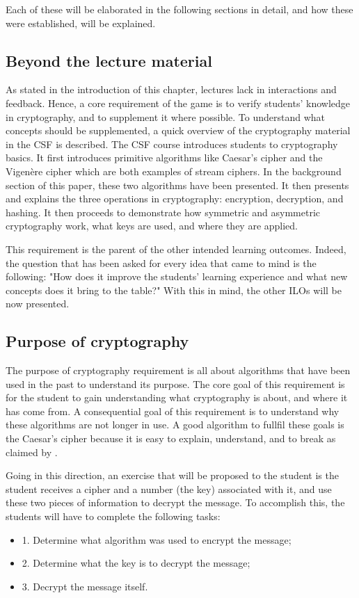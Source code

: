 \documentclass{l4proj}
\begin{document}
Each of these will be elaborated in the following sections in detail, 
and how these were established, will be explained.

\subsection{Beyond the lecture material}

As stated in the introduction of this chapter, lectures lack in interactions and feedback.
Hence, a core requirement of the game is to verify students' knowledge in cryptography, 
and to supplement it where possible. To understand what concepts should be supplemented, 
a quick overview of the cryptography material in the CSF is described.
The CSF course introduces students to cryptography basics.
It first introduces primitive algorithms like Caesar's cipher and the Vigenère cipher which are both
examples of stream ciphers. 
In the background section of this paper, these two algorithms have been presented.
It then presents and explains the three operations in cryptography: encryption, decryption, and hashing.
It then proceeds to demonstrate how symmetric and asymmetric cryptography work, what keys are used, and where they are applied.

This requirement is the parent of the other intended learning outcomes. 
Indeed, the question that has been asked for every idea that came to mind is the following:
"How does it improve the students' learning experience and what new concepts does it bring to the table?"
With this in mind, the other ILOs will be now presented.

\subsection{Purpose of cryptography}

The purpose of cryptography requirement is all about algorithms that have been used in the past to understand its purpose.
The core goal of this requirement is for the student to gain understanding what cryptography is about, and where it has come from.
A consequential goal of this requirement is to understand why these algorithms are not longer in use.
A good algorithm to fullfil these goals is the Caesar's cipher because it is easy to explain, 
understand, and to break as claimed by \citet{anderson_security_2008}.

Going in this direction, an exercise that will be proposed to the student is
the student receives a cipher and a number (the key) associated with it, and use these two pieces of information to decrypt the message.
To accomplish this, the students will have to complete the following tasks:
\begin{itemize}
    \item 1. Determine what algorithm was used to encrypt the message;
    \item 2. Determine what the key is to decrypt the message;
    \item 3. Decrypt the message itself.
\end{itemize}
\end{document}
